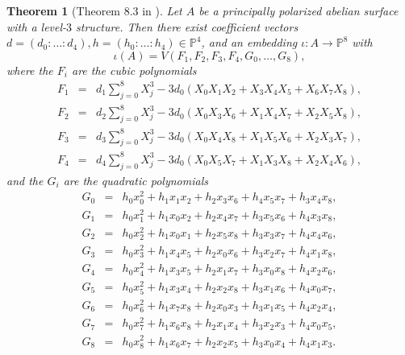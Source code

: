 \documentclass[11pt]{amsart}
\newtheorem{theorem}{Theorem}[section]
\theoremstyle{definition}
\newcommand{\PP}{\mathbb{P}}
\begin{document}
\begin{theorem}[Theorem 8.3 in \cite{gunji2006defining}] \label{thm:defining-equations-dim2}
    Let $A$ be a principally polarized abelian surface with a level-$3$ structure. Then there exist coefficient vectors $d=(d_0: \dots: d_4), h = (h_0:\dots:h_4) \in \PP^4$, and an embedding $\iota: A \to \PP^8$ with
    \[
    \iota(A) = V(F_1,F_2,F_3,F_4, G_0, \dots, G_8),
    \] where
    the $F_i$ are the cubic polynomials
    \begin{eqnarray*}
    F_1 &=& d_1\sum_{j=0}^8 X_j^3 - 3d_0 (X_0X_1X_2 + X_3X_4 X_5 + X_6X_7X_8),\\
    F_2 &=& d_2\sum_{j=0}^8 X_j^3 - 3d_0 (X_0X_3X_6 + X_1X_4 X_7 + X_2X_5X_8),\\
    F_3 &=& d_3\sum_{j=0}^8 X_j^3 - 3d_0 (X_0X_4X_8 + X_1X_5X_6 + X_2X_3X_7),\\
    F_4 &=& d_4\sum_{j=0}^8 X_j^3 - 3d_0 (X_0X_5X_7 + X_1X_3X_8 + X_2X_4X_6),
    \end{eqnarray*}
    and the $G_i$ are the quadratic polynomials 
    \begin{eqnarray*}
        G_0  &=& h_0 x_0^2 + h_1 x_1 x_2 + h_2 x_3 x_6 + h_4 x_5 x_7 + h_3 x_4 x_8,\\
        G_1 &=& h_0x_1^2 + h_1 x_0 x_2 + h_2 x_4 x_7 + h_3 x_5 x_6 + h_4 x_3 x_8,\\
        G_2 &=& h_0 x_2^2 + h_1x_0 x_1 + h_2 x_5 x_8 + h_3 x_3 x_7 + h_4 x_4 x_6,\\
        G_3 &=& h_0x_3^2 + h_1 x_4 x_5 + h_2 x_0 x_6 + h_3 x_2 x_7 + h_4 x_1 x_8,\\
        G_4 &=& h_0x_4^2 + h_1 x_3 x_5 + h_2 x_1 x_7 + h_3 x_0 x_8 + h_4 x_2 x_6,\\
        G_5 &=& h_0 x_5^2 + h_1x_3 x_4 + h_2 x_2 x_8 + h_3 x_1 x_6 + h_4 x_0 x_7,\\
        G_6 &=& h_0 x_6^2 + h_1 x_7 x_8 + h_2x_0 x_3 + h_3 x_1 x_5 + h_4 x_2 x_4,\\
        G_7 &=& h_0 x_7^2 + h_1 x_6 x_8 + h_2 x_1 x_4 + h_3x_2 x_3 + h_4 x_0 x_5,\\
        G_8 &=& h_0 x_8^2 + h_1 x_6 x_7 + h_2 x_2 x_5 + h_3 x_0 x_4 + h_4x_1 x_3.
    \end{eqnarray*}
\end{theorem}
\end{document}
